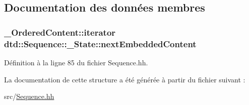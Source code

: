 \subsection{Documentation des données membres}
\hypertarget{structdtd_1_1_sequence_1_1___state_add6dbb226fdf04d4c5d8250add9028f7}{
\subsubsection[{nextEmbeddedContent}]{\setlength{\rightskip}{0pt plus 5cm}\_\-OrderedContent::iterator {\bf dtd::Sequence::\_\-State::nextEmbeddedContent}}}
\label{structdtd_1_1_sequence_1_1___state_add6dbb226fdf04d4c5d8250add9028f7}


Définition à la ligne 85 du fichier Sequence.hh.



La documentation de cette structure a été générée à partir du fichier suivant :\begin{DoxyCompactItemize}
\item 
src/\hyperlink{_sequence_8hh}{Sequence.hh}\end{DoxyCompactItemize}
